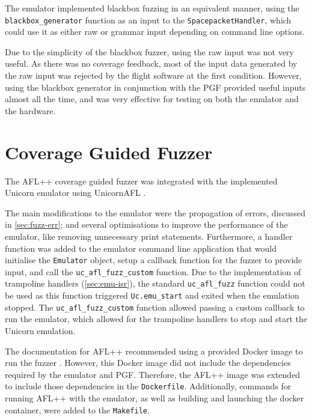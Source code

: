 \documentclass[../report.tex]{subfiles}
\begin{document}
The emulator implemented blackbox fuzzing in an equivalent manner, using the
\lstinline|blackbox_generator| function as an input to the
\lstinline|SpacepacketHandler|, which could use it as either raw or grammar
input depending on command line options.

Due to the simplicity of the blackbox fuzzer, using the raw input was not very
useful. As there was no coverage feedback, most of the input data generated by
the raw input was rejected by the flight software at the first condition.
However, using the blackbox generator in conjunction with the PGF provided
useful inputs almost all the time, and was very effective for testing on both
the emulator and the hardware.

\section{Coverage Guided Fuzzer}

The AFL++ coverage guided fuzzer \citep{AFLplusplus} was integrated with the
implemented Unicorn emulator using UnicornAFL \citep{UnicornMode}.

The main modifications to the emulator were the propagation of errors,
discussed in \autoref{sec:fuzz-err}; and several optimisations to improve the
performance of the emulator, like removing unnecessary print statements.
Furthermore, a handler function was added to the emulator command line
application that would initialise the \lstinline|Emulator| object, setup a
callback function for the fuzzer to provide input, and call the
\lstinline|uc_afl_fuzz_custom| function. Due to the implementation of
trampoline handlers (\autoref{sec:emu-isr}), the standard
\lstinline|uc_afl_fuzz| function could not be used as this function triggered
\lstinline|Uc.emu_start| and exited when the emulation stopped.  The
\lstinline|uc_afl_fuzz_custom| function allowed passing a custom callback to
run the emulator, which allowed for the trampoline handlers to stop and start
the Unicorn emulation.

The documentation for AFL++ recommended using a provided Docker image to run
the fuzzer \citep{AFLDocker}. However, this Docker image did not include the
dependencies required by the emulator and PGF. Therefore, the AFL++ image was
extended to include those dependencies in the \lstinline|Dockerfile|. Additionally,
commands for running AFL++ with the emulator, as well as building and launching
the docker container, were added to the \lstinline|Makefile|.
\end{document}
